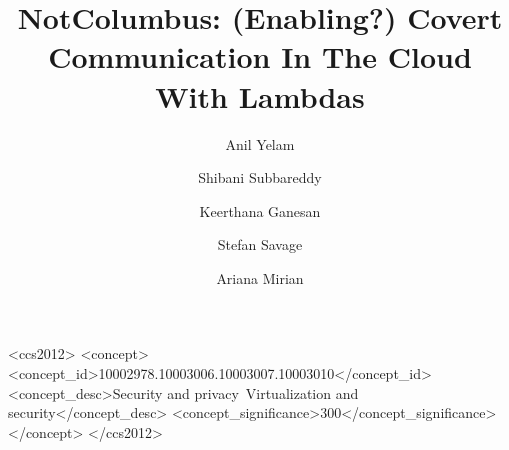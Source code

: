 \documentclass[sigconf,review]{acmart}
\begin{document}
\title[NotColumbus: (Enabling?) Covert Communication In The Cloud With Lambdas]
{NotColumbus: (Enabling?) Covert Communication In The Cloud With Lambdas} %

\author{Anil Yelam}

\author{Shibani Subbareddy}

\author{Keerthana Ganesan}
\authornotemark[1]

\author{Stefan Savage}

\author{Ariana Mirian}






\begin{CCSXML}
<ccs2012>
<concept>
<concept_id>10002978.10003006.10003007.10003010</concept_id>
<concept_desc>Security and privacy~Virtualization and security</concept_desc>
<concept_significance>300</concept_significance>
</concept>
</ccs2012>
\end{CCSXML}
\end{document}
